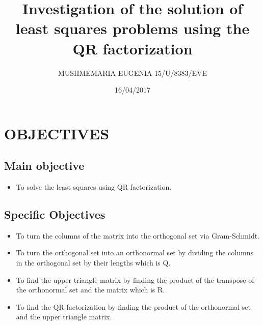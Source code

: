 \documentclass[12pt, letterpaper]{article}
\begin{document}
    \title{Investigation of the solution of least squares problems using the QR factorization}
    \author{MUSIIMEMARIA EUGENIA 15/U/8383/EVE \\}
    \date{16/04/2017}
    \maketitle
\section{OBJECTIVES}
\subsection{Main objective}
\begin{itemize}
    \item To solve the least squares using QR factorization.
\end{itemize}

\subsection{Specific Objectives}
\begin{itemize}
    \item To turn the columns of the matrix into the orthogonal set via Gram-Schmidt. \\
    \item To turn the orthogonal set into an orthonormal set by dividing the columns in the orthogonal set by their lengths which is Q.\\
    \item To find the upper triangle matrix by finding the product of the transpose of the orthonormal set and the matrix which is R.\\
    \item To find the QR factorization by finding the product of the orthonormal set and the upper triangle matrix.\\
\end{itemize}
\end{document}
